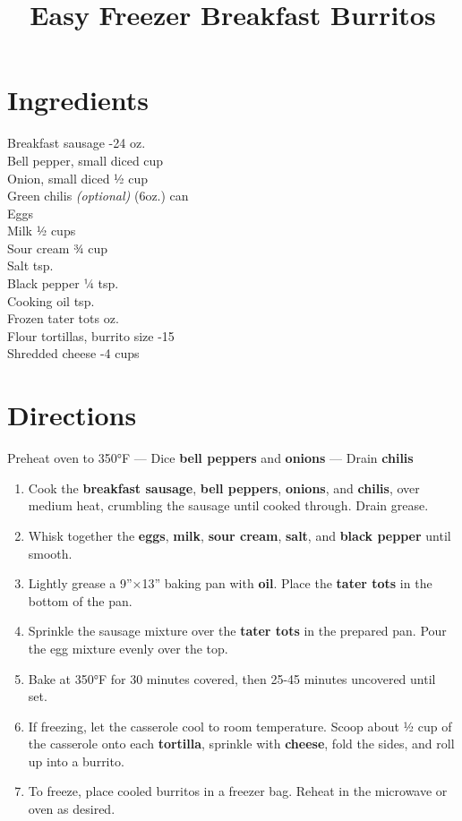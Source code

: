 \documentclass[11pt,letterpaper]{article}
\title{Easy Freezer Breakfast Burritos}
\author{}
\date{}
\begin{document}
\maketitle
\thispagestyle{empty}

\section*{Ingredients}
\setlength{\columnsep}{20pt}
\begin{multicols}{2}
\noindent
    Breakfast sausage -24 oz. \\
    Bell pepper, small diced  cup \\
    Onion, small diced \dotfill ½ cup \\
    Green chilis \textit{(optional)}  (6oz.) can \\
    Eggs  \\
    Milk  ½ cups \\
    \columnbreak
    Sour cream \dotfill ¾ cup \\
    Salt  tsp. \\
    Black pepper \dotfill ¼ tsp. \\
    Cooking oil  tsp. \\
    Frozen tater tots  oz. \\
    Flour tortillas, burrito size -15 \\
    Shredded cheese -4 cups
\end{multicols}

\section*{Directions}

\noindent
Preheat oven to 350°F --- Dice \textbf{bell peppers} and \textbf{onions} --- Drain \textbf{chilis}

\begin{enumerate}
    \item Cook the \textbf{breakfast sausage}, \textbf{bell peppers}, \textbf{onions}, and \textbf{chilis}, over medium heat, crumbling the sausage until cooked through. Drain grease.
    \item Whisk together the \textbf{eggs}, \textbf{milk}, \textbf{ sour cream}, \textbf{salt}, and \textbf{black pepper} until smooth.
    \item Lightly grease a 9”×13” baking pan with \textbf{oil}. Place the \textbf{tater tots} in the bottom of the pan.
    \item Sprinkle the sausage mixture over the \textbf{tater tots} in the prepared pan. Pour the egg mixture evenly over the top. 
    \item Bake at 350°F for 30 minutes covered, then 25-45 minutes uncovered until set.
    \item If freezing, let the casserole cool to room temperature. Scoop about ½ cup of the casserole onto each \textbf{tortilla}, sprinkle with \textbf{cheese}, fold the sides, and roll up into a burrito.
    \item To freeze, place cooled burritos in a freezer bag. Reheat in the microwave or oven as desired.
\end{enumerate}
\end{document}
